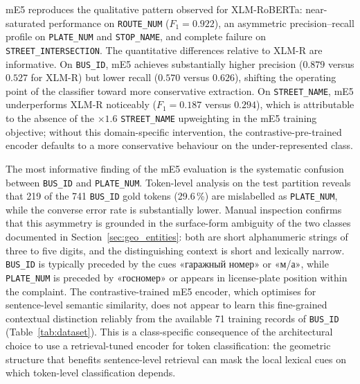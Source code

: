 mE5 reproduces the qualitative pattern observed for XLM-RoBERTa: near-saturated performance on \texttt{ROUTE\_NUM} ($F_1 = 0.922$), an asymmetric precision--recall profile on \texttt{PLATE\_NUM} and \texttt{STOP\_NAME}, and complete failure on \texttt{STREET\_INTERSECTION}. The quantitative differences relative to XLM-R are informative. On \texttt{BUS\_ID}, mE5 achieves substantially higher precision ($0.879$ versus $0.527$ for XLM-R) but lower recall ($0.570$ versus $0.626$), shifting the operating point of the classifier toward more conservative extraction. On \texttt{STREET\_NAME}, mE5 underperforms XLM-R noticeably ($F_1 = 0.187$ versus $0.294$), which is attributable to the absence of the $\times1.6$ \texttt{STREET\_NAME} upweighting in the mE5 training objective; without this domain-specific intervention, the contrastive-pre-trained encoder defaults to a more conservative behaviour on the under-represented class.

The most informative finding of the mE5 evaluation is the systematic confusion between \texttt{BUS\_ID} and \texttt{PLATE\_NUM}. Token-level analysis on the test partition reveals that 219 of the 741 \texttt{BUS\_ID} gold tokens (29.6\,\%) are mislabelled as \texttt{PLATE\_NUM}, while the converse error rate is substantially lower. Manual inspection confirms that this asymmetry is grounded in the surface-form ambiguity of the two classes documented in Section~\ref{sec:geo_entities}: both are short alphanumeric strings of three to five digits, and the distinguishing context is short and lexically narrow. \texttt{BUS\_ID} is typically preceded by the cues \foreignlanguage{russian}{«гаражный номер»} or \foreignlanguage{russian}{«м/а»}, while \texttt{PLATE\_NUM} is preceded by \foreignlanguage{russian}{«госномер»} or appears in license-plate position within the complaint. The contrastive-trained mE5 encoder, which optimises for sentence-level semantic similarity, does not appear to learn this fine-grained contextual distinction reliably from the available 71 training records of \texttt{BUS\_ID} (Table~\ref{tab:dataset}). This is a class-specific consequence of the architectural choice to use a retrieval-tuned encoder for token classification: the geometric structure that benefits sentence-level retrieval can mask the local lexical cues on which token-level classification depends.

